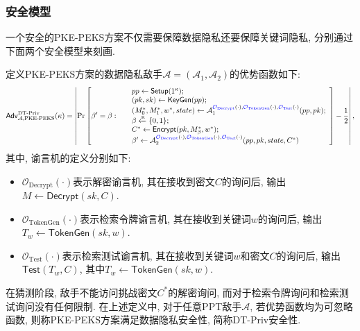 \subsubsection{安全模型}
一个安全的PKE-PEKS方案不仅需要保障数据隐私还要保障关键词隐私, 分别通过下面两个安全模型来刻画.
\begin{definition}[DT-Priv安全性]
定义PKE-PEKS方案的数据隐私敌手$\mathcal{A} = (\mathcal{A}_1, \mathcal{A}_2)$的优势函数如下:
\begin{displaymath}
\mathsf{Adv}_{\mathcal{A}, \text{PKE-PEKS}}^{\text{DT-Priv}}(\kappa) = \left| \Pr \left[\beta' = \beta:~
\begin{array}{ll}
	& pp \leftarrow \mathsf{Setup}(1^\kappa); \\		
	& (pk, sk) \leftarrow \mathsf{KeyGen}(pp);\\
	& (M_0^*, M_1^*, w^*, state) \leftarrow \mathcal{A}_1^{{\color{blue} \mathcal{O}_{\text{Decrypt}}}(\cdot), {\color{blue} \mathcal{O}_{\text{TokenGen}}}(\cdot), {\color{blue} \mathcal{O}_{\text{Test}}}(\cdot)}(pp, pk); \\
	& \beta \xleftarrow{\textup{\tiny R}} \{0, 1\}; \\
	& C^* \leftarrow \mathsf{Encrypt}(pk, M_\beta^*, w^*); \\
	& \beta' \leftarrow \mathcal{A}_2^{{\color{blue} \mathcal{O}_{\text{Decrypt}}}(\cdot), {\color{blue} \mathcal{O}_{\text{TokenGen}}}(\cdot), {\color{blue} \mathcal{O}_{\text{Test}}}(\cdot)}(pp, pk, state, C^*)
	\end{array} 
\right] - \frac{1}{2} \right|,
\end{displaymath}
其中, 谕言机的定义分别如下:
\begin{itemize}
\item $\mathcal{O}_{\text{Decrypt}}(\cdot)$表示解密谕言机, 其在接收到密文$C$的询问后, 输出$M \leftarrow \mathsf{Decrypt}(sk, C)$. 

\item $\mathcal{O}_{\text{TokenGen}}(\cdot)$表示检索令牌谕言机, 其在接收到关键词$w$的询问后, 输出$T_w \leftarrow \mathsf{TokenGen}(sk, w)$. 

\item $\mathcal{O}_{\text{Test}}(\cdot)$表示检索测试谕言机, 其在接收到关键词$w$和密文$C$的询问后, 输出$\mathsf{Test}(T_w, C)$, 其中$T_w \leftarrow \mathsf{TokenGen}(sk, w)$. 
\end{itemize}

在猜测阶段, 敌手不能访问挑战密文$C^*$的解密询问, 而对于检索令牌询问和检索测试询问没有任何限制. 在上述定义中, 对于任意PPT敌手$\mathcal{A}$, 若优势函数均为可忽略函数, 则称PKE-PEKS方案满足数据隐私安全性, 简称DT-Priv安全性.
\end{definition}

